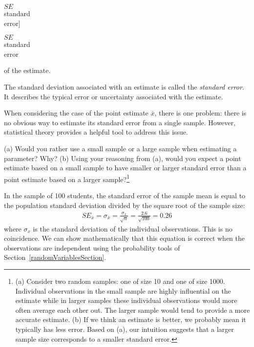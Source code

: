 $SE$\\\footnotesize standard\\error]{\raggedright\vspace{-4mm}

$SE$\\\footnotesize standard\\error} of the estimate.

\begin{termBox}{
The standard deviation associated with an estimate is called the \emph{standard error}. It describes the typical error or uncertainty associated with the estimate.}
\end{termBox}

When considering the case of the point estimate $\bar{x}$, there is one problem: there is no obvious way to estimate its standard error from a single sample. However, statistical theory provides a helpful tool to address this issue. 

\textC{\newpage}

\begin{exercise}
(a) Would you rather use a small sample or a large sample when estimating a parameter? Why? (b) Using your reasoning from (a), would you expect a point estimate based on a small sample to have smaller or larger standard error than a point estimate based on a larger sample?\footnote{(a) Consider two random samples: one of size 10 and one of size 1000. Individual observations in the small sample are highly influential on the estimate while in larger samples these individual observations would more often average each other out. The larger sample would tend to provide a more accurate estimate. (b) If we think an estimate is better, we probably mean it typically has less error. Based on (a), our intuition suggests that a larger sample size corresponds to a smaller standard error.}
\end{exercise}

In the sample of 100 students, the standard error of the sample mean is equal to the population standard deviation divided by the square root of the sample size:
\begin{eqnarray*}
SE_{\bar{x}} = \sigma_{\bar{x}} = \frac{\sigma_{x}}{\sqrt{n}} = \frac{2.6}{\sqrt{100}} = 0.26
\end{eqnarray*}
where $\sigma_{x}$ is the standard deviation of the individual observations. This is no coincidence. We can show mathematically that this equation is correct when the observations are independent using the probability tools of Section~\ref{randomVariablesSection}.

